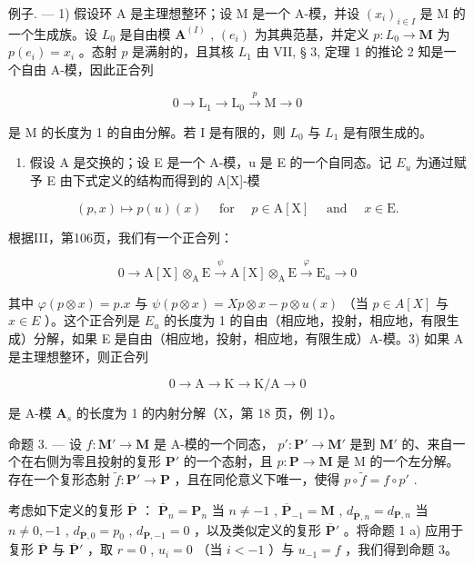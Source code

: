 例子. --- 1) 假设环 A 是主理想整环；设 M 是一个 A-模，并设 \((x_{i})_{i\in I}\) 是 M 的一个生成族。设 \(L_{0}\) 是自由模 \(\mathbf{A}^{(I)}\) , \((e_{i})\) 为其典范基，并定义 \(p:L_{0}\to\mathbf{M}\) 为 \(p(e_{i})=x_{i}\) 。态射 \(p\) 是满射的，且其核 \(L_{1}\) 由 VII, § 3, 定理 1 的推论 2 知是一个自由 A-模，因此正合列

\[
0 \to \mathrm{L} _ {1} \to \mathrm{L} _ {0} \xrightarrow {p} \mathrm{M} \to 0
\]

是 M 的长度为 1 的自由分解。若 I 是有限的，则 \(L_{0}\) 与 \(L_{1}\) 是有限生成的。

\begin{enumerate}
\def\labelenumi{\arabic{enumi})}
\setcounter{enumi}{1}
\tightlist
\item
  假设 A 是交换的；设 E 是一个 A-模，u 是 E 的一个自同态。记 \(E_{u}\) 为通过赋予 E 由下式定义的结构而得到的 A{[}X{]}-模
\end{enumerate}

\[
(p, x) \mapsto p (u) (x) \quad \text { for } \quad p \in \mathrm{A} [ \mathrm{X} ] \quad \text { and } \quad x \in \mathrm{E}.
\]

根据III，第106页，我们有一个正合列：

\[
0 \to \mathrm{A} [ \mathrm{X} ] \otimes_ {\mathrm{A}} \mathrm{E} \stackrel {\psi} {\to} \mathrm{A} [ \mathrm{X} ] \otimes_ {\mathrm{A}} \mathrm{E} \stackrel {\varphi} {\to} \mathrm{E} _ {u} \to 0
\]

其中 \(\varphi(p \otimes x) = p.x\) 与 \(\psi(p \otimes x) = Xp \otimes x - p \otimes u(x)\) （当 \(p \in A[X]\) 与 \(x \in E\) ）。这个正合列是 \(E_u\) 的长度为 1 的自由（相应地，投射，相应地，有限生成）分解，如果 E 是自由（相应地，投射，相应地，有限生成）A-模。3) 如果 A 是主理想整环，则正合列

\[
0 \rightarrow \mathrm{A} \rightarrow \mathrm{K} \rightarrow \mathrm{K/A} \rightarrow 0
\]

是 A-模 \(\mathbf{A}_s\) 的长度为 1 的内射分解（X，第 18 页，例 1）。

命题 3. --- 设 \(f: \mathbf{M}' \to \mathbf{M}\) 是 A-模的一个同态， \(p': \mathbf{P}' \to \mathbf{M}'\) 是到 \(\mathbf{M}'\) 的、来自一个在右侧为零且投射的复形 \(\mathbf{P}'\) 的一个态射，且 \(p: \mathbf{P} \to \mathbf{M}\) 是 M 的一个左分解。存在一个复形态射 \(\tilde{f}: \mathbf{P}' \to \mathbf{P}\) ，且在同伦意义下唯一，使得 \(p \circ \tilde{f} = f \circ p'\) .

考虑如下定义的复形 \(\overline{\mathbf{P}}\) ： \(\overline{\mathbf{P}}_n = \mathbf{P}_n\) 当 \(n \neq -1\) , \(\overline{\mathbf{P}}_{-1} = \mathbf{M}\) , \(d_{\overline{\mathbf{P}},n} = d_{\mathbf{P},n}\) 当 \(n \neq 0, -1\) , \(d_{\overline{\mathbf{P}},0} = p_0\) , \(d_{\overline{\mathbf{P}},-1} = 0\) ，以及类似定义的复形 \(\overline{\mathbf{P}}'\) 。将命题 1 a) 应用于复形 \(\overline{\mathbf{P}}\) 与 \(\overline{\mathbf{P}}'\) ，取 \(r=0\) , \(u_i = 0\) （当 \(i < -1\) ）与 \(u_{-1} = f\) ，我们得到命题 3。

